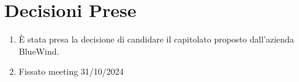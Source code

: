 \documentclass{TWReport}
\begin{document}
	\section*{Decisioni Prese}
	\begin{enumerate}
		\item È stata presa la decisione di candidare il capitolato proposto dall'azienda BlueWind.
		\item Fissato meeting 31/10/2024

	\end{enumerate}
\end{document}
